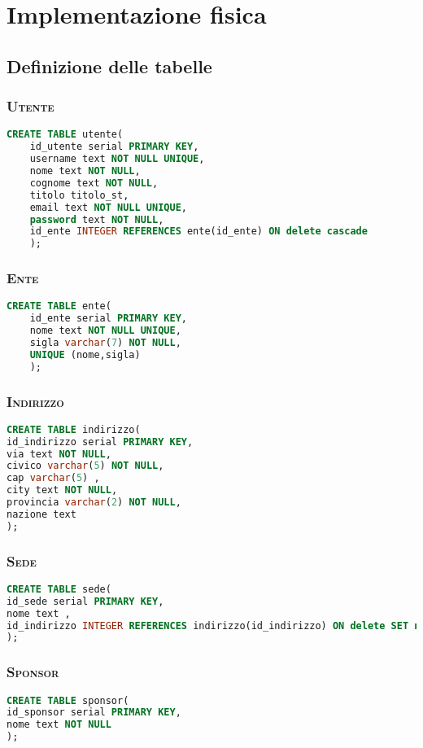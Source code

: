 \chapter{Implementazione fisica}

\section{Definizione delle tabelle}
\subsection{\textsc{Utente}}
\begin{lstlisting}[language=SQL,style=mystyle,caption={Tabella: Utente}]
	CREATE TABLE utente(
	id_utente serial PRIMARY KEY,
	username text NOT NULL UNIQUE,
	nome text NOT NULL,
	cognome text NOT NULL,
	titolo titolo_st,
	email text NOT NULL UNIQUE,
	password text NOT NULL,
	id_ente INTEGER REFERENCES ente(id_ente) ON delete cascade
	);
\end{lstlisting}
\subsection{\textsc{Ente}}
\begin{lstlisting}[language=SQL,style=mystyle,caption={Tabella: Ente}]
	CREATE TABLE ente(
	id_ente serial PRIMARY KEY,
	nome text NOT NULL UNIQUE,
	sigla varchar(7) NOT NULL,
	UNIQUE (nome,sigla)
	);
\end{lstlisting}
\subsection{\textsc{Indirizzo}}
\begin{lstlisting}[language=SQL,style=mystyle,caption={Tabella: Indirizzo}]
CREATE TABLE indirizzo(
id_indirizzo serial PRIMARY KEY,
via text NOT NULL,
civico varchar(5) NOT NULL,
cap varchar(5) ,
city text NOT NULL,
provincia varchar(2) NOT NULL,
nazione text
);
\end{lstlisting}
\subsection{\textsc{Sede}}
\begin{lstlisting}[language=SQL,style=mystyle,caption={Tabella:  Sede}]
CREATE TABLE sede(
id_sede serial PRIMARY KEY,
nome text ,
id_indirizzo INTEGER REFERENCES indirizzo(id_indirizzo) ON delete SET null
);
\end{lstlisting}
\subsection{\textsc{Sponsor}}
\begin{lstlisting}[language=SQL,style=mystyle,caption={Tabella: Sponsor}]
CREATE TABLE sponsor(
id_sponsor serial PRIMARY KEY,
nome text NOT NULL
);
\end{lstlisting}
